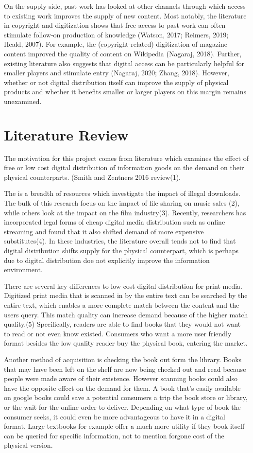 \documentclass{article}
\begin{document}
On the supply side, past work has looked at other channels through which access to existing work improves the supply of new content. Most notably, the literature in copyright and digitization shows that free access to past work can often stimulate follow-on production of knowledge (Watson, 2017; Reimers, 2019; Heald, 2007). For example, the (copyright-related) digitization of magazine content improved the quality of content on Wikipedia (Nagaraj, 2018). Further, existing literature also suggests that digital access can be particularly helpful for smaller players and stimulate entry (Nagaraj, 2020; Zhang, 2018). However, whether or not digital distribution itself can improve the supply of physical products and whether it benefits smaller or larger players on this margin remains unexamined.

\section{Literature Review}
The motivation for this project comes from literature which examines the effect of free or low cost digital distribution of information goods on the demand on their physical counterparts. (Smith and Zentners 2016 review(1). 

The is a breadth of resources which investigate the impact of illegal downloads. The bulk of this research focus on the impact of file sharing on music sales (2), while others look at the impact on the film industry(3). Recently, researchers has incorporated legal forms of cheap digital media distribution such as online streaming and found that it also shifted demand of more expensive substitutes(4). In these industries, the literature overall tends not to find that digital distribution shifts supply for the physical counterpart, which is perhaps due to digital distribution doe not explicitly improve the information environment.

There are several key differences to low cost digital distribution for print media. Digitized print media that is scanned in by the entire text can be searched by the entire text, which enables a more complete match between the content and the users query. This match quality can increase demand because of the higher match quality.(5) Specifically, readers are able to find books that they would not want to read or not even know existed. Consumers who want a more user friendly format besides the low quality reader buy the physical book, entering the market.
 
Another method of acquisition is checking the book out form the library. Books that may have been left on the shelf are now being checked out and read because people were made aware of their existence. However scanning books could also have the opposite effect on the demand for them. A book that’s easily available on google books could save a potential consumers a trip the book store or library, or the wait for the online order to deliver. Depending on what type of book the consumer seeks, it could even be more advantageous to have it in a digital format. Large textbooks for example offer a much more utility if they book itself can be queried for specific information, not to mention forgone cost of the physical version.
  
\end{document}
